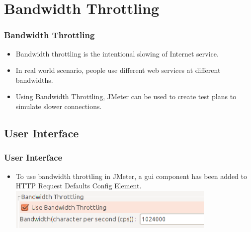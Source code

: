 \documentclass[12pt]{beamer}
\begin{document}
\section{Bandwidth Throttling}
\begin{frame}[c]
\frametitle{Bandwidth Throttling}
  			\begin{itemize}
				\item<+-|alert@+>Bandwidth throttling is the intentional slowing of Internet service. \\
				\item<+-|alert@+>In real world scenario, people use different web services  at different bandwidths. \\

				\item<+-|alert@+> Using Bandwidth Throttling, JMeter can be used to create test plans to simulate slower connections.

			\end{itemize}

\end{frame}

\subsection{User Interface}
\begin{frame}[c]

\frametitle{User Interface}
 \begin{itemize}
  \item<+-| alert@+> To use bandwidth throttling in JMeter, a gui component has been added to HTTP Request Defaults Config Element.\\
  \vspace{1cm}
  \includegraphics[width=10cm, height=2cm]{images/bt1}
 \end{itemize}
\end{frame}
\end{document}
